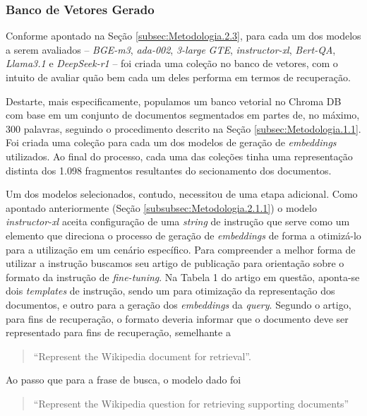 \subsubsection{Banco de Vetores Gerado}
\label{subsubsec:Resultados.2.1.2}
Conforme apontado na Seção \ref{subsec:Metodologia.2.3}, para cada um dos modelos a serem avaliados -- \textit{BGE-m3}, \textit{ada-002}, \textit{3-large} \textit{GTE}, \textit{instructor-xl}, \textit{Bert-QA}, \textit{Llama3.1} e \textit{DeepSeek-r1} -- foi criada uma coleção no banco de vetores, com o intuito de avaliar quão bem cada um deles performa em termos de recuperação.

Destarte, mais especificamente, populamos um banco vetorial no Chroma DB com base em um conjunto de documentos segmentados em partes de, no máximo, 300 palavras, seguindo o procedimento descrito na Seção \ref{subsec:Metodologia.1.1}. Foi criada uma coleção para cada um dos modelos de geração de \textit{embeddings} utilizados. Ao final do processo, cada uma das coleções tinha uma representação distinta dos 1.098 fragmentos resultantes do secionamento dos documentos.

Um dos modelos selecionados, contudo, necessitou de uma etapa adicional. Como apontado anteriormente (Seção \ref{subsubsec:Metodologia.2.1.1}) o modelo \textit{instructor-xl} aceita configuração de uma \textit{string} de instrução que serve como um elemento que direciona o processo de geração de \textit{embeddings} de forma a otimizá-lo para a utilização em um cenário específico. Para compreender a melhor forma de utilizar a instrução buscamos seu artigo de publicação \cite{Instructor:1} para orientação sobre o formato da instrução de \textit{fine-tuning}. Na Tabela 1 do artigo em questão, aponta-se dois \textit{templates} de instrução, sendo um para otimização da representação dos documentos, e outro para a geração dos \textit{embeddings} da \textit{query}. Segundo o artigo, para fins de recuperação, o formato deveria informar que o documento deve ser representado para fins de recuperação, semelhante a 

\begin{quote}
{
\footnotesize
\ttfamily
    ``Represent the Wikipedia document for retrieval''.
}
\end{quote}

Ao passo que para a frase de busca, o modelo dado foi

\begin{quote}
{
\footnotesize
\ttfamily
    ``Represent the Wikipedia question for retrieving supporting documents''
}
\end{quote}

